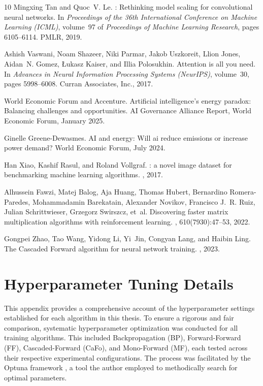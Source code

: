 \documentclass[11pt, english]{article}
\begin{document}
\begin{thebibliography}{10}
Mingxing Tan and Quoc~V. Le.
: Rethinking model scaling for convolutional neural
  networks.
\newblock In {\em Proceedings of the 36th International Conference on Machine
  Learning (ICML)}, volume~97 of {\em Proceedings of Machine Learning
  Research}, pages 6105--6114. PMLR, 2019.

Ashish Vaswani, Noam Shazeer, Niki Parmar, Jakob Uszkoreit, Llion Jones,
  Aidan~N. Gomez, {\L}ukasz Kaiser, and Illia Polosukhin.
\newblock Attention is all you need.
\newblock In {\em Advances in Neural Information Processing Systems (NeurIPS)},
  volume~30, pages 5998--6008. Curran Associates, Inc., 2017.

{World Economic Forum} and {Accenture}.
\newblock Artificial intelligence's energy paradox: Balancing challenges and
  opportunities.
\newblock AI Governance Alliance Report, World Economic Forum, January 2025.

Ginelle Greene-Dewasmes.
\newblock AI and energy: Will ai reduce emissions or increase power demand?
\newblock World Economic Forum, July 2024.

Han Xiao, Kashif Rasul, and Roland Vollgraf.
: a novel image dataset for benchmarking machine
  learning algorithms.
, 2017.


Alhussein Fawzi, Matej Balog, Aja Huang, Thomas Hubert, Bernardino
  Romera-Paredes, Mohammadamin Barekatain, Alexander Novikov, Francisco J.~R.
  Ruiz, Julian Schrittwieser, Grzegorz Swirszcz, et~al.
\newblock Discovering faster matrix multiplication algorithms with
  reinforcement learning.
, 610(7930):47--53, 2022.

Gongpei Zhao, Tao Wang, Yidong Li, Yi~Jin, Congyan Lang, and Haibin Ling.
\newblock The {Cascaded Forward} algorithm for neural network training.
, 2023.

\end{thebibliography}


\pagebreak 
\appendix

\section{Hyperparameter Tuning Details}
\label{app:hyper_tuning}
This appendix provides a comprehensive account of the hyperparameter settings established for each algorithm in this thesis. To ensure a rigorous and fair comparison, systematic hyperparameter optimization was conducted for all training algorithms. This included Backpropagation (BP), Forward-Forward (FF), Cascaded-Forward (CaFo), and Mono-Forward (MF), each tested across their respective experimental configurations. The process was facilitated by the Optuna framework \cite{akiba2019optuna}, a tool the author employed to methodically search for optimal parameters.
\end{document}
